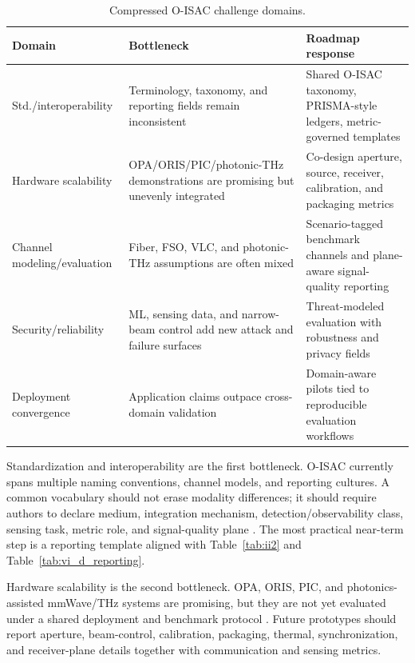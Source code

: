 \documentclass[letterpaper,journal]{IEEEtran}
\begin{document}
\begin{table}[!t]
    \caption{Compressed O-ISAC challenge domains.}
    \label{tab:challenge_compact}
    \centering
    \scriptsize
    \setlength{\tabcolsep}{2.8pt}
    \renewcommand{\arraystretch}{1.08}
    \begin{tabularx}{\textwidth}{@{}p{2.4cm}p{3.0cm}X@{}}
        \toprule
        Domain & Bottleneck & Roadmap response \\
        \midrule
        Std./interoperability & Terminology, taxonomy, and reporting fields remain inconsistent & Shared O-ISAC taxonomy, PRISMA-style ledgers, metric-governed templates \\
        Hardware scalability & OPA/ORIS/PIC/photonic-THz demonstrations are promising but unevenly integrated & Co-design aperture, source, receiver, calibration, and packaging metrics \\
        Channel modeling/evaluation & Fiber, FSO, VLC, and photonic-THz assumptions are often mixed & Scenario-tagged benchmark channels and plane-aware signal-quality reporting \\
        Security/reliability & ML, sensing data, and narrow-beam control add new attack and failure surfaces & Threat-modeled evaluation with robustness and privacy fields \\
        Deployment convergence & Application claims outpace cross-domain validation & Domain-aware pilots tied to reproducible evaluation workflows \\
        \bottomrule
    \end{tabularx}
\end{table}

Standardization and interoperability are the first bottleneck. O-ISAC currently spans multiple naming conventions, channel models, and reporting cultures. A common vocabulary should not erase modality differences; it should require authors to declare medium, integration mechanism, detection/observability class, sensing task, metric role, and signal-quality plane \cite{O_ISAC_161,O_ISAC_162,O_ISAC_327}. The most practical near-term step is a reporting template aligned with Table~\ref{tab:ii2} and Table~\ref{tab:vi_d_reporting}.

Hardware scalability is the second bottleneck. OPA, ORIS, PIC, and photonics-assisted mmWave/THz systems are promising, but they are not yet evaluated under a shared deployment and benchmark protocol \cite{O_ISAC_008,O_ISAC_036,O_ISAC_061,O_ISAC_091,O_ISAC_145,O_ISAC_163}. Future prototypes should report aperture, beam-control, calibration, packaging, thermal, synchronization, and receiver-plane details together with communication and sensing metrics.
\end{document}
